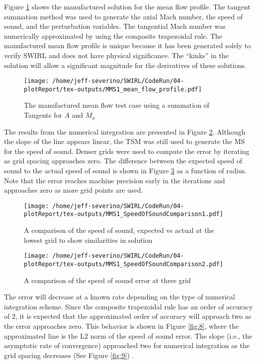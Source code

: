 Figure \ref{fig:1} shows the manufactured solution for the mean flow profile. The tangent
summation method was used to generate the axial Mach number, the speed of sound, and the perturbation variables. The tangential Mach number was numerically
approximated by using the composite trapezoidal rule. The manufactured mean flow
profile is unique because it has been generated solely to verify SWIRL
and does not have physical significance. The “kinks” in the solution will allow a significant magnitude for the derivatives of these solutions.
\begin{figure}[h!]
    \centering
    \texttt{[image: /home/jeff-severino/SWIRL/CodeRun/04-plotReport/tex-outputs/MMS1\_mean\_flow\_profile.pdf]}
    \caption{The manufactured mean flow test case using a summation of Tangents for $A$ and $M_x$}
    \label{fig:1}
\end{figure}
The results from the numerical integration are presented in Figure \ref{fig:5}. Although
the slope of the line appears linear, the TSM was still used to generate the MS for
the speed of sound. Denser grids were used to compute the error by iterating as 
grid spacing approaches zero. The difference between the expected speed of sound
to the actual speed of sound is shown in Figure \ref{fig:5a} as a function of 
radius. Note that the error reaches machine precision early in the 
iterations and approaches zero as more grid points are used.

\begin{figure}[h!]
    \centering
    \texttt{[image: /home/jeff-severino/SWIRL/CodeRun/04-plotReport/tex-outputs/MMS1\_SpeedOfSoundComparison1.pdf]}
    \caption{ A comparison of the speed of sound, expected vs actual at the lowest grid to show similarities in solution}
    \label{fig:5}
\end{figure}


\begin{figure}[h!]
    \centering
    \texttt{[image: /home/jeff-severino/SWIRL/CodeRun/04-plotReport/tex-outputs/MMS1\_SpeedOfSoundComparison2.pdf]}
    \caption{ A comparison of the speed of sound error at three grid}
    \label{fig:5a}
\end{figure}
The error will decrease at a known rate depending on the type of numerical integration scheme. Since the composite trapezoidal rule has an order of accuracy
of 2, it is expected that the approximated order of accuracy will approach two as the
error approaches zero. This behavior is shown in Figure \ref{fig:8}, where the approximated
line is the L2 norm of the speed of sound error. The slope (i.e., the asymptotic rate of
convergence) approached two for numerical integration as the grid spacing decreases
(See Figure \ref{fig:9}) .

